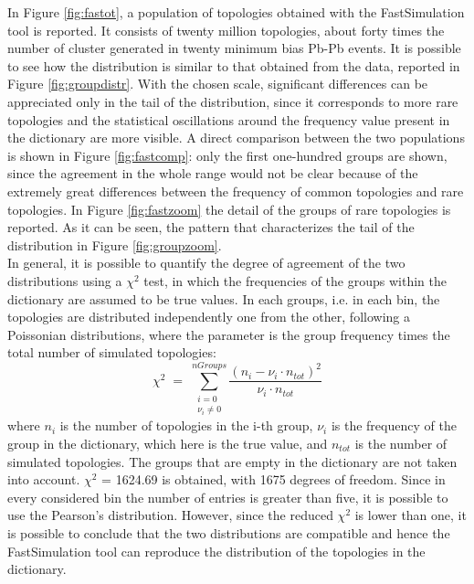 In Figure \ref{fig:fastot}, a population of topologies obtained with the FastSimulation tool is reported. It consists of twenty million topologies, about forty times the number of cluster generated in twenty minimum bias Pb-Pb events. It is possible to see how the distribution is similar to that obtained from the data, reported in Figure \ref{fig:groupdistr}. With the chosen scale, significant differences can be appreciated only in the tail of the distribution, since it corresponds to more rare topologies and the statistical oscillations around the frequency value present in the dictionary are more visible. A direct comparison between the two populations is shown in Figure \ref{fig:fastcomp}: only the first one-hundred groups are shown, since the agreement in the whole range would not be clear because of the extremely great differences between the frequency of common topologies and rare topologies. In Figure \ref{fig:fastzoom} the detail of the groups of rare topologies is reported. As it can be seen, the pattern that characterizes the tail of the distribution in Figure \ref{fig:groupzoom}.\\
In general, it is possible to quantify the degree of agreement of the two distributions using a $\chi^2$ test, in which the frequencies of the groups within the dictionary are assumed to be true values. In each groups, i.e. in each bin, the topologies are distributed independently one from the other, following a Poissonian distributions, where the parameter is the group frequency times the total number of simulated topologies:
\begin{equation}
 \chi^2 \; = \; \sum_{\substack{i=0 \\ \nu_i \neq 0}}^{nGroups}\frac{(n_i - \nu_i\cdot n_{tot})^2}{\nu_i\cdot n_{tot}}
\end{equation}
where $n_i$ is the number of topologies in the i-th group, $\nu_i$ is the frequency of the group in the dictionary, which here is the true value, and $n_{tot}$ is the number of simulated topologies. The groups that are empty in the dictionary are not taken into account. $\chi^2$ = 1624.69 is obtained, with 1675 degrees of freedom. Since in every considered bin the number of entries is greater than five, it is possible to use the Pearson's distribution. However, since the reduced $\chi^2$ is lower than one, it is possible to conclude that the two distributions are compatible and hence the FastSimulation tool can reproduce the distribution of the topologies in the dictionary.\\
%
